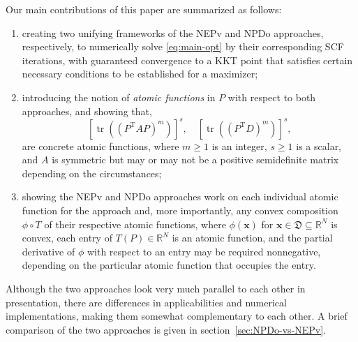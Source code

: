 \documentclass[11pt]{article}
\def\bx{\pmb{x}}
\def\bbR{\mathbb{R}}
\DeclareMathOperator{\tr}{tr}
\DeclareMathOperator{\T}{T}
\theoremstyle{definition}
\numberwithin{equation}{section}
\begin{document}
Our main contributions of this paper are summarized as follows:
\begin{enumerate}[(1)]
  \item creating two unifying frameworks of the NEPv and NPDo approaches, respectively, to numerically solve \eqref{eq:main-opt}
        by their corresponding SCF iterations,
        with guaranteed convergence to a KKT point that satisfies certain necessary conditions to be
        established for a maximizer;
  \item introducing the notion of {\em atomic functions\/} in $P$ with respect to both approaches, and showing that,
        \begin{equation}\label{eq:concrete-AF}
        [\tr((P^{\T}AP)^m)]^s,\quad
        [\tr((P^{\T}D)^m)]^s,
        \end{equation}
        are concrete atomic functions, where $m\ge 1$ is an integer, $s\ge 1$ is a scalar, and $A$ is symmetric but may or may not be a positive semidefinite matrix depending on the circumstances;

  \item  showing the  NEPv and NPDo approaches
         work on each individual atomic function  for the approach and, more importantly, any convex composition $\phi\circ T$ of their respective atomic functions, where
         $\phi(\bx)$ for $\bx\in\mathfrak{D}\subseteq\bbR^N$ is convex, each entry of $T(P)\in\bbR^N$
         is an atomic function,
         and the partial derivative of $\phi$
         with respect to an entry may be required nonnegative, depending on the particular atomic function that occupies the entry.
\end{enumerate}
Although the two approaches look very much parallel to each other in presentation, there are differences in applicabilities
and numerical implementations, making them somewhat complementary to each other.
A brief comparison of the two approaches is given in section~\ref{sec:NPDo-vs-NEPv}.
\end{document}
